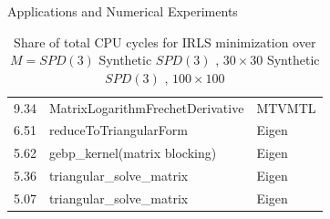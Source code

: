 \begin{chapter}{Applications and Numerical Experiments}
\begin{table}[h!]
{\begin{tabular}{rll}
	9.34& MatrixLogarithmFrechetDerivative& MTVMTL\\
	6.51& reduceToTriangularForm& Eigen\\
	5.62& gebp\_kernel(matrix blocking)& Eigen\\
	5.36& triangular\_solve\_matrix& Eigen\\
	5.07& triangular\_solve\_matrix& Eigen\\
	\hline
	\end{tabular}
}
\caption[Share of total CPU cycles $SPD(3)$]{Share of total CPU cycles for IRLS minimization over $M=SPD(3)$
 Synthetic $SPD(3)$ , $30\times 30$
 Synthetic $SPD(3)$ , $100\times 100$
\label{table:perf_spd}
}
\end{table}



\end{chapter}
